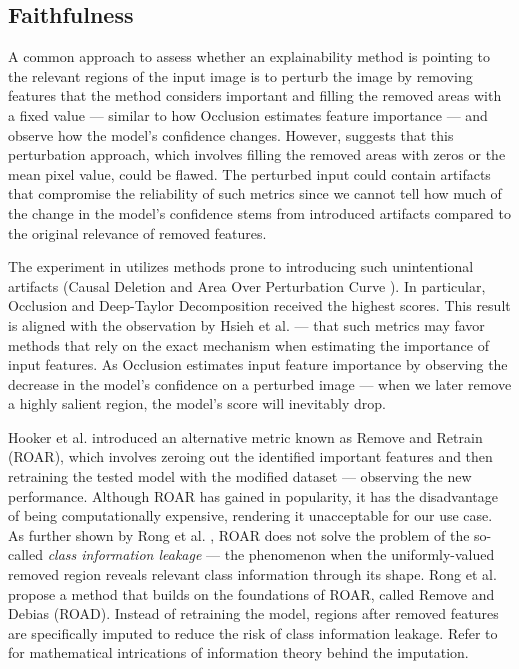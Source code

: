 \subsection*{Faithfulness}

A common approach to assess whether an explainability method is pointing to the relevant regions of the input image is to perturb the image by removing features that the method considers important and filling the removed areas with a fixed value  --- similar to how Occlusion estimates feature importance --- and observe how the model's confidence changes.
However, \cite{roar} suggests that this perturbation approach, which involves filling the removed areas with zeros or the mean pixel value, could be flawed.
The perturbed input could contain artifacts that compromise the reliability of such metrics since we cannot tell how much of the change in the model's confidence stems from introduced artifacts compared to the original relevance of removed features.

The experiment in \cite{gallo} utilizes methods prone to introducing such unintentional artifacts (Causal Deletion \cite{xai-causal-deletion} and Area Over Perturbation Curve \cite{xai-aopc}).
In particular, Occlusion and Deep-Taylor Decomposition \cite{xai-dtd} received the highest scores.
This result is aligned with the observation by Hsieh et al. \cite{xai-hsieh-occ-dtd} --- that such metrics may favor methods that rely on the exact mechanism when estimating the importance of input features.
As Occlusion estimates input feature importance by observing the decrease in the model's confidence on a perturbed image --- when we later remove a highly salient region, the model's score will inevitably drop.

Hooker et al. \cite{roar} introduced an alternative metric known as Remove and Retrain (ROAR), which involves zeroing out the identified important features and then retraining the tested model with the modified dataset --- observing the new performance.
Although ROAR has gained in popularity, it has the disadvantage of being computationally expensive, rendering it unacceptable for our use case.
As further shown by Rong et al. \cite{road}, ROAR does not solve the problem of the so-called \emph{class information leakage} --- the phenomenon when the uniformly-valued removed region reveals relevant class information through its shape.
Rong et al. \cite{road} propose a method that builds on the foundations of ROAR, called Remove and Debias (ROAD).
Instead of retraining the model, regions after removed features are specifically imputed to reduce the risk of class information leakage.
Refer to \cite{road} for mathematical intrications of information theory behind the imputation.

